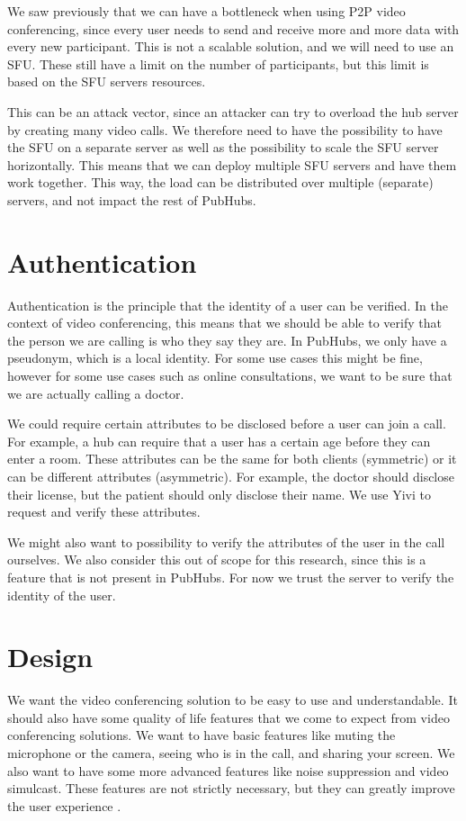 \documentclass{report}
\begin{document}
We saw previously that we can have a bottleneck when using P2P video conferencing, since every user needs to send
and receive more and more data with every new participant. This is not a scalable solution, and we will need to use
an SFU. These still have a limit on the number of participants, but this limit is based on the SFU servers resources.

This can be an attack vector, since an attacker can try to overload the hub server by creating many video calls. We
therefore need to have the possibility to have the SFU on a separate server as well as the possibility to scale the SFU
server horizontally. This means that we can deploy multiple SFU servers and have them work together.
This way, the load can be distributed over multiple (separate) servers, and not impact the rest of PubHubs.

\section{Authentication}
Authentication is the principle that the identity of a user can be verified. In the context of video conferencing,
this means that we should be able to verify that the person we are calling is who they say they are. In PubHubs, we
only have a pseudonym, which is a local identity. For some use cases this might be fine, however for some use cases
such as online consultations, we want to be sure that we are actually calling a doctor.

We could require certain attributes to be disclosed before a user can join a call. For example, a hub
can require that a user has a certain age before they can enter a room. These attributes can be the same for both
clients (symmetric) or it can be different attributes (asymmetric). For example, the doctor should disclose their license, but the patient should only
disclose their name. We use Yivi to request and verify these attributes.

We might also want to possibility to verify the attributes of the user in the call ourselves. We also consider this out
of scope for this research, since this is a feature that is not present in PubHubs. For now we trust the server to
verify the identity of the user.

\section{Design}
We want the video conferencing solution to be easy to use and understandable. It should also have some quality of life
features that we come to expect from video conferencing solutions. We want to have basic features like muting the
microphone or the camera, seeing who is in the call, and sharing your screen. We also want to have some more advanced
features like noise suppression and video simulcast. These features are not strictly necessary, but they can greatly
improve the user experience \cite{Skowronek_Raake_Berndtsson_Rummukainen_Usai_Gunkel_Johanson_Habets_Malfait_Lindero_et al._2022}.
\end{document}
